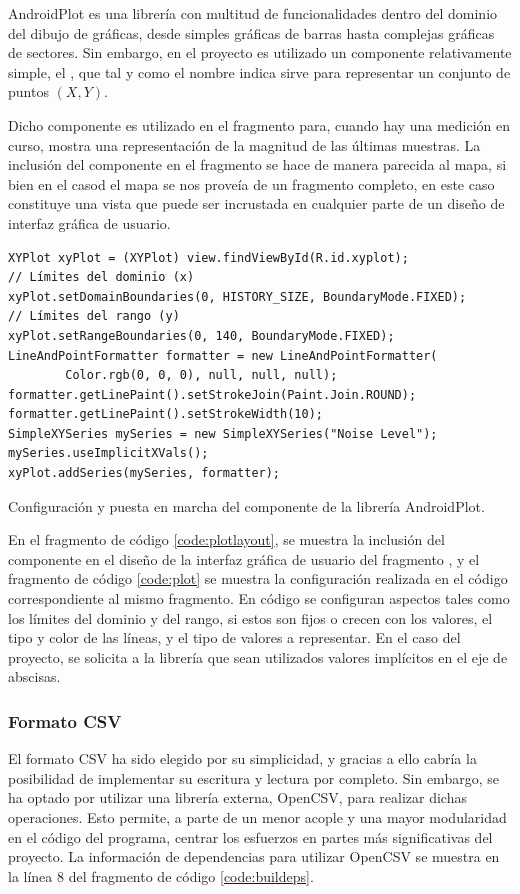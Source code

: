     AndroidPlot es una librería con multitud de funcionalidades dentro del dominio del dibujo de gráficas, desde simples gráficas de barras hasta complejas gráficas de sectores. Sin embargo, en el proyecto es utilizado un componente relativamente simple, el , que tal y como el nombre indica sirve para representar un conjunto de puntos $(X,Y)$. 
    
    Dicho componente es utilizado en el fragmento  para, cuando hay una medición en curso, mostra una representación de la magnitud de las últimas muestras. La inclusión del componente en el fragmento se hace de manera parecida al mapa, si bien en el casod el mapa se nos proveía de un fragmento completo, en este caso  constituye una vista que puede ser incrustada en cualquier parte de un diseño de interfaz gráfica de usuario. 
        
\begin{listing}[h] 
\begin{verbatim}
XYPlot xyPlot = (XYPlot) view.findViewById(R.id.xyplot);
// Límites del dominio (x)
xyPlot.setDomainBoundaries(0, HISTORY_SIZE, BoundaryMode.FIXED);
// Límites del rango (y)
xyPlot.setRangeBoundaries(0, 140, BoundaryMode.FIXED);
LineAndPointFormatter formatter = new LineAndPointFormatter(
        Color.rgb(0, 0, 0), null, null, null);
formatter.getLinePaint().setStrokeJoin(Paint.Join.ROUND);
formatter.getLinePaint().setStrokeWidth(10);
SimpleXYSeries mySeries = new SimpleXYSeries("Noise Level");
mySeries.useImplicitXVals();
xyPlot.addSeries(mySeries, formatter);
\end{verbatim}
\caption{Configuración y puesta en marcha del componente  de la librería AndroidPlot.}
\label{code:plot}
\end{listing}
    
    En el fragmento de código \ref{code:plotlayout}, se muestra la inclusión del componente en el diseño de la interfaz gráfica de usuario del fragmento , y el fragmento de código \ref{code:plot} se muestra la configuración realizada en el código correspondiente al mismo fragmento. En código se configuran aspectos tales como los límites del dominio y del rango, si estos son fijos o crecen con los valores, el tipo y color de las líneas, y el tipo de valores a representar. En el caso del proyecto, se solicita a la librería que sean utilizados valores implícitos en el eje de abscisas.

\subsubsection{Formato CSV}
    El formato CSV ha sido elegido por su simplicidad, y gracias a ello cabría la posibilidad de implementar su escritura y lectura por completo. Sin embargo, se ha optado por utilizar una librería externa, OpenCSV, para realizar dichas operaciones. Esto permite, a parte de un menor acople y una mayor modularidad en el código del programa, centrar los esfuerzos en partes más significativas del proyecto. La información de dependencias para utilizar OpenCSV se muestra en la línea 8 del fragmento de código \ref{code:buildeps}. 
    
